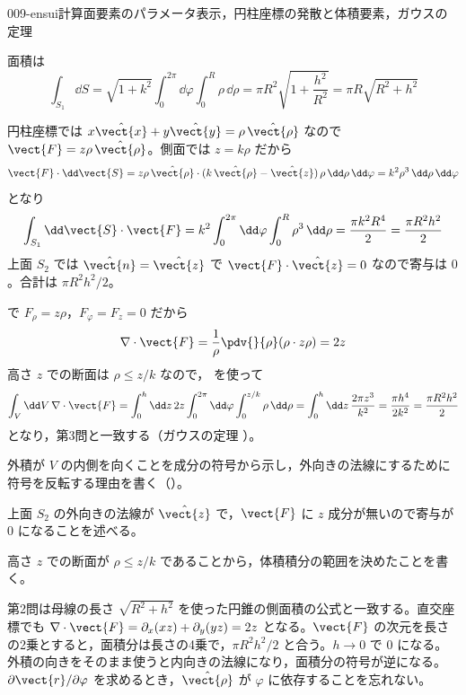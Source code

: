 \documentclass[uplatex,dvipdfmx,a4paper,11pt]{jsarticle}
\begin{document}
\begin{mondai}{009-ensui}{計算}{面要素のパラメータ表示，円柱座標の発散と体積要素，ガウスの定理}
\begin{tadashii}
 面積は
\[ \int_{S_1}\dd S = \sqrt{1 + k^2}\int_0^{2\pi}\dd\varphi\int_0^R\rho\,\dd\rho = \pi R^2\sqrt{1 + \frac{h^2}{R^2}} = \pi R\sqrt{R^2 + h^2} \]

 円柱座標では $x\hat{\vect{x}} + y\hat{\vect{y}} = \rho\,\hat{\vect{\rho}}$ なので $\vect{F} = z\rho\,\hat{\vect{\rho}}$。側面では $z = k\rho$ だから
\[ \vect{F}\cdot\dd\vect{S} = z\rho\,\hat{\vect{\rho}}\cdot(k\,\hat{\vect{\rho}} - \hat{\vect{z}})\,\rho\,\dd\rho\,\dd\varphi = k^2\rho^3\,\dd\rho\,\dd\varphi \]
となり
\[ \int_{S_1}\dd\vect{S}\cdot\vect{F} = k^2\int_0^{2\pi}\dd\varphi\int_0^R\rho^3\,\dd\rho = \frac{\pi k^2R^4}{2} = \frac{\pi R^2h^2}{2} \]
上面 $S_2$ では $\hat{\vect{n}} = \hat{\vect{z}}$ で $\vect{F}\cdot\hat{\vect{z}} = 0$ なので寄与は $0$。合計は $\pi R^2h^2/2$。

  で $F_\rho = z\rho$，$F_\varphi = F_z = 0$ だから
\[ \nabla\cdot\vect{F} = \frac{1}{\rho}\pdv{}{\rho}(\rho\cdot z\rho) = 2z \]
高さ $z$ での断面は $\rho \le z/k$ なので， を使って
\[ \int_V\dd V\,\nabla\cdot\vect{F} = \int_0^h\dd z\,2z\int_0^{2\pi}\dd\varphi\int_0^{z/k}\rho\,\dd\rho = \int_0^h\dd z\,\frac{2\pi z^3}{k^2} = \frac{\pi h^4}{2k^2} = \frac{\pi R^2h^2}{2} \]
となり，第3問と一致する（ガウスの定理 ）。
\begin{ronten}
  \item {} 外積が $V$ の内側を向くことを成分の符号から示し，外向きの法線にするために符号を反転する理由を書く（）。
  \item {} 上面 $S_2$ の外向きの法線が $\hat{\vect{z}}$ で，$\vect{F}$ に $z$ 成分が無いので寄与が $0$ になることを述べる。
  \item {} 高さ $z$ での断面が $\rho\le z/k$ であることから，体積積分の範囲を決めたことを書く。
\end{ronten}
\kenzan 第2問は母線の長さ $\sqrt{R^2 + h^2}$ を使った円錐の側面積の公式と一致する。直交座標でも $\nabla\cdot\vect{F} = \partial_x(xz) + \partial_y(yz) = 2z$ となる。$\vect{F}$ の次元を長さの2乗とすると，面積分は長さの4乗で，$\pi R^2h^2/2$ と合う。$h \to 0$ で $0$ になる。
\tsumazuki 外積の向きをそのまま使うと内向きの法線になり，面積分の符号が逆になる。$\partial\vect{r}/\partial\varphi$ を求めるとき，$\hat{\vect{\rho}}$ が $\varphi$ に依存することを忘れない。
\end{tadashii}
\end{mondai}
\end{document}
